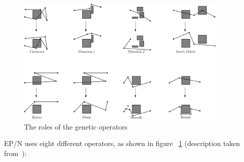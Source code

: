 \begin{figure}[ht!]
\begin{center}
\includegraphics[width=0.9\textwidth]{images/operators.pdf}
\caption{The roles of the genetic operators}
\label{fig:operators}
\end{center}
\end{figure}
EP/N uses eight different operators, as shown in figure~%
\ref{fig:operators} (description taken from~\cite{Xiao96}):
